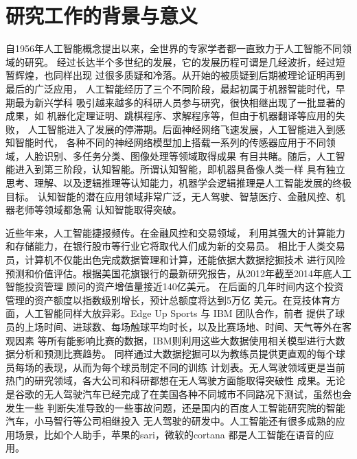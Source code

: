 \documentclass{standalone}
\begin{document}
\thesischapterexordium

\section{研究工作的背景与意义}
自1956年人工智能概念提出以来，全世界的专家学者都一直致力于人工智能不同领域的研究。
经过长达半个多世纪的发展，它的发展历程可谓是几经波折，经过短暂辉煌，也同样出现
过很多质疑和冷落。从开始的被质疑到后期被理论证明再到最后的广泛应用，
人工智能经历了三个不同阶段，最起初属于机器智能时代，早期最为新兴学科
吸引越来越多的科研人员参与研究，很快相继出现了一批显著的成果，如
机器化定理证明、跳棋程序、求解程序等，但由于机器翻译等应用的失败，
人工智能进入了发展的停滞期。后面神经网络飞速发展，人工智能进入到感知智能时代，
各种不同的神经网络模型加上搭载一系列的传感器应用于不同领域，人脸识别、多任务分类、图像处理等领域取得成果
有目共睹。随后，人工智能进入到第三阶段，认知智能。所谓认知智能，即机器具备像人类一样
具有独立思考、理解、以及逻辑推理等认知能力，机器学会逻辑推理是人工智能发展的终极目标。
认知智能的潜在应用领域非常广泛，无人驾驶、智慧医疗、金融风控、机器老师等领域都急需
认知智能取得突破。

近些年来，人工智能捷报频传。在金融风控和交易领域，
利用其强大的计算能力和存储能力，在银行股市等行业它将取代人们成为新的交易员。
相比于人类交易员，计算机不仅能出色完成数据管理和计算，还能依据大数据挖掘技术
进行风险预测和价值评估。根据美国花旗银行的最新研究报告，从2012年截至2014年底人工智能投资管理
顾问的资产增值量接近140亿美元。
在后面的几年时间内这个投资管理的资产额度以指数级别增长，预计总额度将达到5万亿
美元。在竞技体育方面，人工智能同样大放异彩。Edge Up Sports 与 IBM 团队合作，前者
提供了球员的上场时间、进球数、每场触球平均时长，以及比赛场地、时间、天气等外在客观因素
等所有能影响比赛的数据，IBM则利用这些大数据使用相关模型进行大数据分析和预测比赛趋势。
同样通过大数据挖掘可以为教练员提供更直观的每个球员每场的表现，从而为每个球员制定不同的训练
计划表。无人驾驶领域更是当前热门的研究领域，各大公司和科研都想在无人驾驶方面能取得突破性
成果。无论是谷歌的无人驾驶汽车已经完成了在美国各种不同城市不同路况下测试，虽然也会发生一些
判断失准导致的一些事故问题，还是国内的百度人工智能研究院的智能汽车，小马智行等公司相继投入
无人驾驶的研发中。人工智能还有很多成熟的应用场景，比如个人助手，苹果的sari，微软的cortana
都是人工智能在语音的应用。
\end{document}
